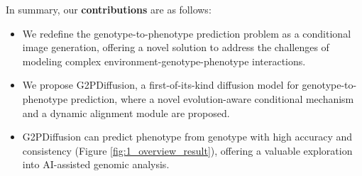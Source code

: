 In summary, our \textbf{contributions} are as follows: 
\begin{itemize}
    \item We redefine the genotype-to-phenotype prediction problem as a conditional image generation, offering a novel solution to address the challenges of modeling complex environment-genotype-phenotype interactions.
    \item We propose G2PDiffusion, a first-of-its-kind diffusion model for genotype-to-phenotype prediction, where a novel evolution-aware conditional mechanism and a dynamic alignment module are proposed.
    \item G2PDiffusion can predict phenotype from genotype with high accuracy and consistency (Figure \ref{fig:1_overview_result}), offering a valuable exploration into AI-assisted genomic analysis.
    
\end{itemize}





